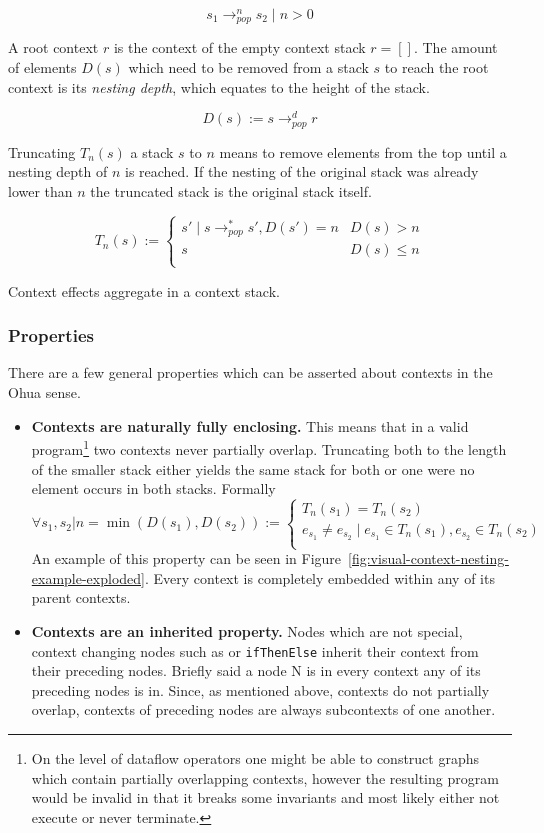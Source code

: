 \[
  s_1 \rightarrow_{pop}^n s_2 \mid n > 0
\]

A root context $r$ is the context of the empty context stack $r = []$.
The amount of elements $D(s)$ which need to be removed from a stack $s$ to reach the root context is its \emph{nesting depth}, which equates to the height of the stack.

\[
  D(s) := s \rightarrow_{pop}^d r
\]

Truncating $T_n(s)$ a stack $s$ to $n$ means to remove elements from the top until a nesting depth of $n$ is reached.
If the nesting of the original stack was already lower than $n$ the truncated stack is the original stack itself.

\[
  T_n(s) :=
  \begin{cases}
    s' \mid s \rightarrow_{pop}^* s', D(s') = n & D(s) > n \\
    s & D(s) \leq n \\
  \end{cases}
\]

Context effects aggregate in a context stack.


\subsubsection{Properties}

There are a few general properties which can be asserted about contexts in the Ohua sense.

\begin{itemize}
  \item \textbf{Contexts are naturally fully enclosing.}
        This means that in a valid program\footnote{On the level of dataflow operators one might be able to construct graphs which contain partially overlapping contexts, however the resulting program would be invalid in that it breaks some invariants and most likely either not execute or never terminate.} two contexts never partially overlap.
        Truncating both to the length of the smaller stack either yields the same stack for both or one were no element occurs in both stacks.
        Formally
        \[
        \forall s_1, s_2 | n = \min(D(s_1), D(s_2)) :=
          \begin{cases}
            T_n(s_1) = T_n(s_2) \\
            e_{s_1} \neq e_{s_2} \mid e_{s_1} \in T_n(s_1), e_{s_2} \in T_n(s_2) \\
          \end{cases}
        \]
        An example of this property can be seen in Figure~\ref{fig:visual-context-nesting-example-exploded}.
        Every context is completely embedded within any of its parent contexts.

  \item \textbf{Contexts are an inherited property.}
        Nodes which are not special, context changing nodes such as \smap{} or \texttt{ifThenElse} inherit their context from their preceding nodes.
        Briefly said a node N is in every context any of its preceding nodes is in.
        Since, as mentioned above, contexts do not partially overlap, contexts of preceding nodes are always subcontexts of one another.
\end{itemize}

